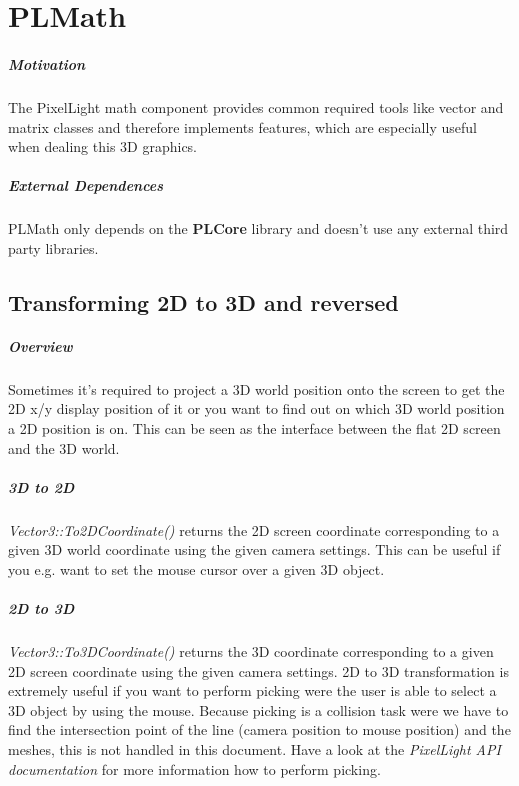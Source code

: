 \chapter{PLMath}


\paragraph{Motivation}
The PixelLight math component provides common required tools like vector and matrix classes and therefore implements features, which are especially useful when dealing this 3D graphics.


\paragraph{External Dependences}
PLMath only depends on the \textbf{PLCore} library and doesn't use any external third party libraries.




\section{Transforming 2D to 3D and reversed}


\paragraph{Overview}
Sometimes it's required to project a 3D world position onto the screen to get the 2D x/y display position of it or you want to find out on which 3D world position a 2D position is on. This can be seen as the interface between the flat 2D screen and the 3D world.


\paragraph{3D to 2D}
\emph{Vector3::To2DCoordinate()} returns the 2D screen coordinate corresponding to a given 3D world coordinate using the given camera settings. This can be useful if you e.g. want to set the mouse cursor over a given 3D object.


\paragraph{2D to 3D}
\emph{Vector3::To3DCoordinate()} returns the 3D coordinate corresponding to a given 2D screen coordinate using the given camera settings. 2D to 3D transformation is extremely useful if you want to perform picking were the user is able to select a 3D object by using the mouse. Because picking is a collision task were we have to find the intersection point of the line (camera position to mouse position) and the meshes, this is not handled in this document. Have a look at the \emph{PixelLight API documentation} for more information how to perform picking.





